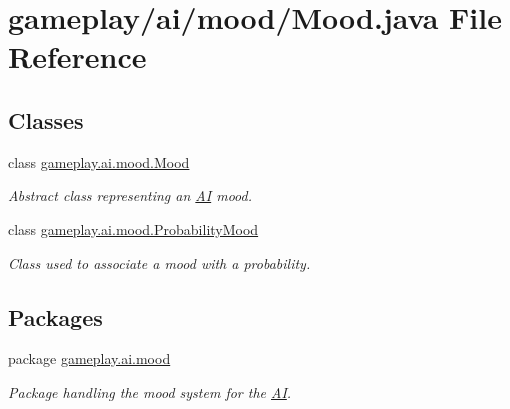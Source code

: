 \hypertarget{a00047}{\section{gameplay/ai/mood/\-Mood.java File Reference}
\label{a00047}
}
\subsection*{Classes}
\begin{DoxyCompactItemize}
\item 
class \hyperlink{a00015}{gameplay.\-ai.\-mood.\-Mood}
\begin{DoxyCompactList}\small\item\em Abstract class representing an \hyperlink{a00001}{A\-I} mood. \end{DoxyCompactList}\item 
class \hyperlink{a00021}{gameplay.\-ai.\-mood.\-Probability\-Mood}
\begin{DoxyCompactList}\small\item\em Class used to associate a mood with a probability. \end{DoxyCompactList}\end{DoxyCompactItemize}
\subsection*{Packages}
\begin{DoxyCompactItemize}
\item 
package \hyperlink{a00083}{gameplay.\-ai.\-mood}
\begin{DoxyCompactList}\small\item\em Package handling the mood system for the \hyperlink{a00001}{A\-I}. \end{DoxyCompactList}\end{DoxyCompactItemize}
